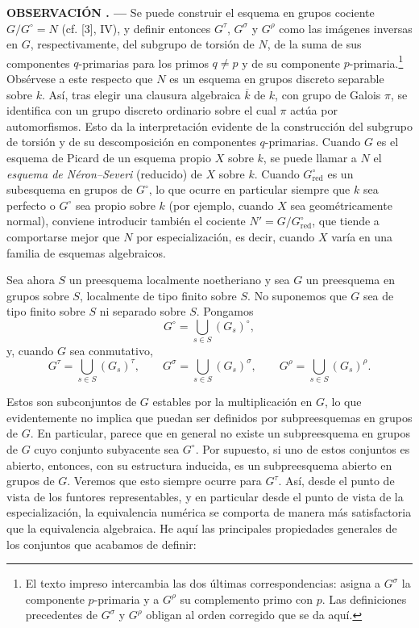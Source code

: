 \documentclass[11pt,twoside,openany]{book}
\numberwithin{equation}{section}
\newcommand{\src}[1]{%
  \phantomsection\hypertarget{src:#1}{}%
  \marginpar{\raggedleft\footnotesize\sffamily #1}%
}
\theoremstyle{plain}
\theoremstyle{definition}
\theoremstyle{remark}
\newcommand{\result}[2]{%
  \par\medskip\noindent\textbf{#1%
  \if\relax\detokenize{#2}\relax\else\space#2\fi. ---}\enspace
}
\newcommand{\FgaUnitKey}{frontmatter}
\renewcommand{\src}[1]{%
  \phantomsection\hypertarget{src:\FgaUnitKey:#1}{}%
  \marginpar{\raggedleft\footnotesize\sffamily #1}%
}
\theoremstyle{plain}
\theoremstyle{definition}
\theoremstyle{remark}
\begin{document}
\result{OBSERVACIÓN}{} Se puede construir el esquema en grupos cociente
$G/G^\circ=N$ (cf. [3], IV), y definir entonces $G^\tau$, $G^\sigma$ y
$G^\rho$ como las imágenes inversas en $G$, respectivamente, del subgrupo de
torsión de $N$, de la suma de sus componentes $q$-primarias para los primos
$q\neq p$ y de su componente $p$-primaria.\footnote{El texto impreso intercambia
las dos últimas correspondencias: asigna a $G^\sigma$ la componente
$p$-primaria y a $G^\rho$ su complemento primo con $p$. Las definiciones
precedentes de $G^\sigma$ y $G^\rho$ obligan al orden corregido que se da aquí.}
Obsérvese a este respecto que $N$ es un esquema en
grupos discreto separable sobre $k$. Así, tras elegir una clausura algebraica
$\overline k$ de $k$, con grupo de Galois $\pi$, se identifica con un grupo
discreto ordinario sobre el cual $\pi$ actúa por automorfismos. Esto da la
interpretación evidente de la construcción del subgrupo de torsión y de su
descomposición en componentes $q$-primarias. Cuando $G$ es el esquema de
Picard de un esquema propio $X$ sobre $k$, se puede llamar a $N$ el
\emph{esquema de Néron--Severi} (reducido) de $X$ sobre $k$. Cuando
$G^\circ_{\mathrm{red}}$ es un subesquema en grupos de $G^\circ$, lo que ocurre
en particular siempre que $k$ sea perfecto o $G^\circ$ sea propio sobre $k$
(por ejemplo, cuando $X$ sea geométricamente normal), conviene introducir
también el cociente $N'=G/G^\circ_{\mathrm{red}}$, que tiende a comportarse
mejor que $N$ por especialización, es decir, cuando $X$ varía en una familia
de esquemas algebraicos.

Sea ahora $S$ un preesquema localmente noetheriano y sea $G$ un preesquema en
grupos sobre $S$, localmente de tipo finito sobre $S$. No suponemos que $G$ sea
de tipo finito sobre $S$ ni separado sobre $S$. Pongamos
\[
G^\circ=\bigcup_{s\in S}(G_s)^\circ,
\]
y, cuando $G$ sea conmutativo,
\[
G^\tau=\bigcup_{s\in S}(G_s)^\tau,
\qquad
G^\sigma=\bigcup_{s\in S}(G_s)^\sigma,
\qquad
G^\rho=\bigcup_{s\in S}(G_s)^\rho.
\]

\src{224}
Estos son subconjuntos de $G$ estables por la multiplicación en $G$, lo que
evidentemente no implica que puedan ser definidos por subpreesquemas en grupos
de $G$. En particular, parece que en general no existe un subpreesquema en
grupos de $G$ cuyo conjunto subyacente sea $G^\circ$. Por supuesto, si uno de
estos conjuntos es abierto, entonces, con su estructura inducida, es un
subpreesquema abierto en grupos de $G$. Veremos que esto siempre ocurre para
$G^\tau$. Así, desde el punto de vista de los funtores representables, y en
particular desde el punto de vista de la especialización, la equivalencia
numérica se comporta de manera más satisfactoria que la equivalencia
algebraica. He aquí las principales propiedades generales de los conjuntos que
acabamos de definir:
\end{document}
